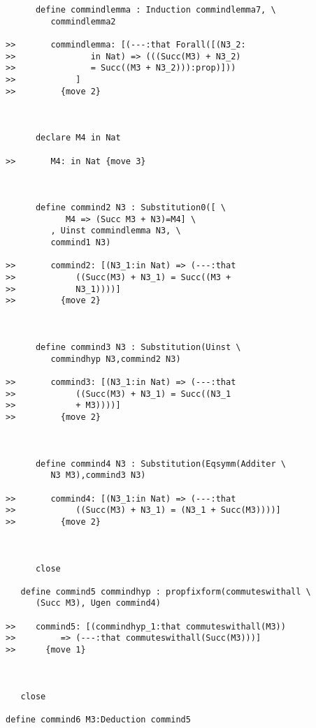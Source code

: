 \documentclass[12pt]{article}
\begin{document}
\begin{verbatim}
      define commindlemma : Induction commindlemma7, \
         commindlemma2

>>       commindlemma: [(---:that Forall([(N3_2:
>>               in Nat) => (((Succ(M3) + N3_2)
>>               = Succ((M3 + N3_2))):prop)]))
>>            ]
>>         {move 2}



      declare M4 in Nat

>>       M4: in Nat {move 3}



      define commind2 N3 : Substitution0([ \
            M4 => (Succ M3 + N3)=M4] \
         , Uinst commindlemma N3, \
         commind1 N3)

>>       commind2: [(N3_1:in Nat) => (---:that
>>            ((Succ(M3) + N3_1) = Succ((M3 +
>>            N3_1))))]
>>         {move 2}



      define commind3 N3 : Substitution(Uinst \
         commindhyp N3,commind2 N3)

>>       commind3: [(N3_1:in Nat) => (---:that
>>            ((Succ(M3) + N3_1) = Succ((N3_1
>>            + M3))))]
>>         {move 2}



      define commind4 N3 : Substitution(Eqsymm(Additer \
         N3 M3),commind3 N3)

>>       commind4: [(N3_1:in Nat) => (---:that
>>            ((Succ(M3) + N3_1) = (N3_1 + Succ(M3))))]
>>         {move 2}



      close

   define commind5 commindhyp : propfixform(commuteswithall \
      (Succ M3), Ugen commind4)

>>    commind5: [(commindhyp_1:that commuteswithall(M3))
>>         => (---:that commuteswithall(Succ(M3)))]
>>      {move 1}



   close

define commind6 M3:Deduction commind5


\end{verbatim}
\end{document}

